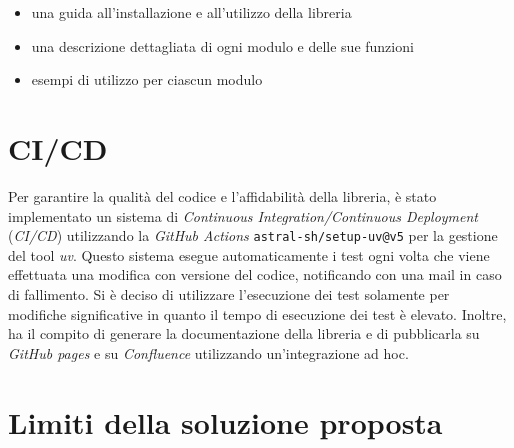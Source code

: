 \begin{itemize}
    \item una guida all'installazione e all'utilizzo della libreria
    \item una descrizione dettagliata di ogni modulo e delle sue funzioni
    \item esempi di utilizzo per ciascun modulo
\end{itemize}

\section{CI/CD}

Per garantire la qualità del codice e l'affidabilità della libreria, è stato implementato un sistema di \textit{Continuous Integration/Continuous Deployment} (\textit{CI/CD}) utilizzando la \textit{GitHub Actions} \texttt{astral-sh/setup-uv@v5} per la gestione del tool \textit{uv}. Questo sistema esegue automaticamente i test ogni volta che viene effettuata una modifica con versione del codice, notificando con una mail in caso di fallimento. Si è deciso di utilizzare l'esecuzione dei test solamente per modifiche significative in quanto il tempo di esecuzione dei test è elevato. Inoltre, ha il compito di generare la documentazione della libreria e di pubblicarla su \textit{GitHub pages} e su \textit{Confluence} utilizzando un'integrazione ad hoc.

\section{Limiti della soluzione proposta}



